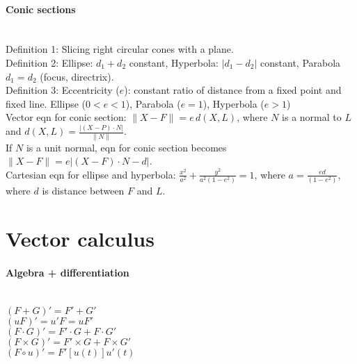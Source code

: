 \documentclass[10pt]{article}
\begin{document}
\paragraph{Conic sections}\ \\
Definition 1: Slicing right circular cones with a plane.\\
Definition 2: Ellipse: $d_1+d_2$ constant, Hyperbola: $\lvert d_1-d_2\rvert$ constant, 
Parabola $d_1 = d_2$ (focus, directrix).\\
Definition 3: Eccentricity ($e$): constant ratio of distance from a fixed point and fixed line.
Ellipse ($0<e<1$), Parabola ($e=1$), Hyperbola ($e>1$)\\
Vector eqn for conic section: $\lVert X-F\rVert = e\, d(X,L)$, where $N$ is a normal to $L$ and 
$d(X,L)=\frac{\lvert(X-P)\cdot N\rvert}{\lVert N\rVert}$.\\
If $N$ is a unit normal, eqn for conic section becomes $\lVert X-F\rVert = e\lvert (X-F)\cdot N - d\rvert$.\\
Cartesian eqn for ellipse and hyperbola: $\frac{x^2}{a^2}+\frac{y^2}{a^2(1-e^2)}=1$, where
$a=\frac{ed}{(1-e^2)}$, where $d$ is distance between $F$ and $L$.



\bigskip\bigskip
\section {Vector calculus}\smallskip

\paragraph{Algebra + differentiation}\ \\
$(F+G)' = F' + G'$\\
$(uF)' = u'F = uF'$\\
$(F\cdot G)' = F'\cdot G + F\cdot G'$\\
$(F\times G)' = F'\times G + F\times G'$\\
$(F \circ u)' = F'[u(t)]u'(t)$
\end{document}
